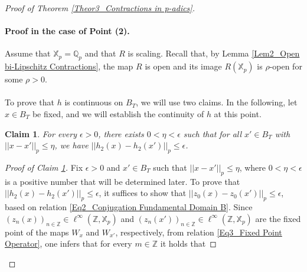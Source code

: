 \documentclass[10pt,a4paper]{amsart}
\newtheorem{claim}{Claim}
\begin{document}
\begin{proof}[Proof of Theorem \ref{Theor3_Contractions in p-adics}]
		
		
		
		\paragraph{Proof in the case of Point (2).} Assume that $\mathbb{X}_{p} = \mathbb{Q}_{p}$ and that $R$ is scaling. Recall that, by Lemma \ref{Lem2_Open bi-Lipschitz Contractions}, the map $R$ is open and its image $R \left(  \mathbb{X}_{p}  \right) $ is $\rho$-open for some $\rho  > 0$. 
		
		
		
		
		
		\paragraph{} 	
		
		To prove that $h$ is continuous on $B_{T}$, we will use two claims. In the following, let $x \in B_{T}$ be fixed, and we will establish the continuity of $h$ at this point.
		
		\begin{claim}\label{Claim3 Homeomorphism 2 on B_T}
			For every $ \epsilon  > 0$, there exists $ 0 <  \eta <  \epsilon $ such that for all $x' \in B_{T}$ with $ \left| \left|  x - x'  \right|  \right|_{p} \le  \eta $, we have $  \left| \left|  h_{2} \left(  x  \right)   - h_{2} \left(  x'  \right)   \right|  \right|_{p}  \le  \epsilon $. 
			
		\end{claim}
		
		\begin{proof}[Proof of Claim \ref{Claim3 Homeomorphism 2 on B_T}]
			
			Fix $  \epsilon  > 0$ and $x' \in B_{T}$ such that $ \left| \left|  x - x'  \right|  \right|_{p} \le  \eta $, where $ 0 <  \eta <  \epsilon $ is a positive number that will be determined later. 
			To prove that $ \left| \left|  h_{2}(x) - h_{2} \left(  x'  \right)   \right|  \right|_{p} \le  \epsilon $, it suffices to show that $ \left| \left|  z_{0}(x) - z_{0} \left(  x'  \right)   \right|  \right|_{p} \le  \epsilon $, based on relation \eqref{Eq2_Conjugation Fundamental Domain B}.    
			Since $ \left(  z_{n} \left(  x  \right)    \right)_{n \in \mathbb{Z} } \in \ell^{ \infty } \left(  \mathbb{Z} , \mathbb{X}_{p}  \right) $ and $ \left(  z_{n} \left(  x'  \right)    \right)_{n \in \mathbb{Z} } \in \ell^{ \infty } \left(  \mathbb{Z} , \mathbb{X}_{p}  \right) $ are the fixed point of the maps $W_{x}$ and $W_{x'}$, respectively, from relation \eqref{Eq3_Fixed Point Operator}, one infers that for every $m \in \mathbb{Z} $ it holds that
			

\end{proof}
\end{proof}
\end{document}
